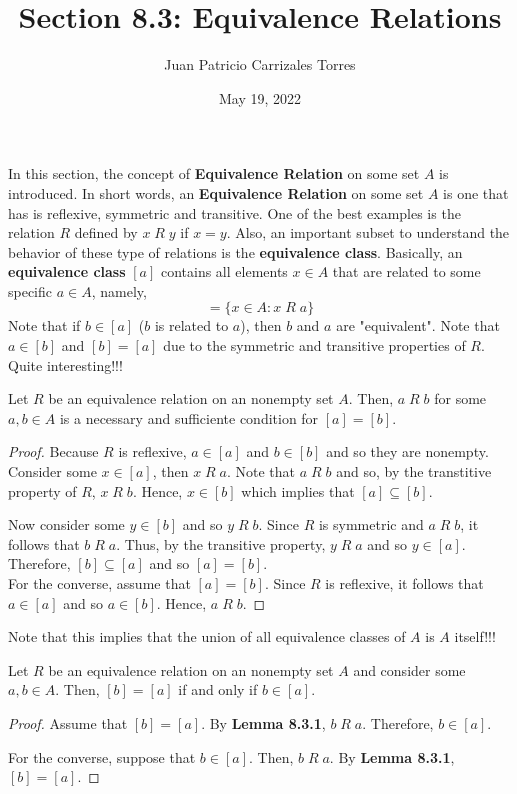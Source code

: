 \documentclass[12pt]{article}
\newenvironment{lemma}[2][Lemma]{\begin{trivlist}
		\item[\hskip \labelsep {\bfseries #1}\hskip \labelsep {\bfseries #2.}]}{\end{trivlist}}
\newenvironment{corollary}[2][Corollary]{\begin{trivlist}
		\item[\hskip \labelsep {\bfseries #1}\hskip \labelsep {\bfseries #2.}]}{\end{trivlist}}
\begin{document}
 
	
	\title{Section 8.3: Equivalence Relations}
	\author{Juan Patricio Carrizales Torres}
	\date{May 19, 2022}
	\maketitle
	
	In this section, the concept of \textbf{Equivalence Relation} on some set $A$ is introduced. In short words, an \textbf{Equivalence Relation} on some set $A$ is one that has is reflexive, symmetric and transitive. One of the best examples is the relation $R$ defined by $x\; R \; y$ if $x=y$. Also, an important subset to understand the behavior of these type of relations is the \textbf{equivalence class}. Basically, an \textbf{equivalence class} $[a]$ contains all elements $x\in A$ that are related to some specific $a\in A$, namely, 
	\begin{equation*}
		[a] = \{x\in A: x\; R \;a\}
	\end{equation*}
	Note that if $b\in [a]$ ($b$ is related to $a$), then $b$ and $a$ are "equivalent". Note that $a\in[b]$ and $[b]=[a]$ due to the symmetric and transitive properties of $R$. Quite interesting!!!  
	
	\begin{lemma}{8.3.1}
		Let $R$ be an equivalence relation on an nonempty set $A$. Then, $a\; R \; b$ for some $a,b\in A$ is a necessary and sufficiente condition for $[a]=[b]$.
		\begin{proof}
			Because $R$ is reflexive, $a\in [a]$ and $b\in [b]$ and so they are nonempty. Consider some $x\in [a]$, then $x\; R \; a$. Note that $a\; R \; b$ and so, by the transtitive property of $R$, $x\; R \; b$. Hence, $x\in [b]$ which implies that $[a]\subseteq [b]$.
			
			Now consider some $y\in [b]$ and so $y\; R\; b$. Since $R$ is symmetric and $a\; R \; b$, it follows that $b\; R \;a$. Thus, by the transitive property, $y\; R\; a$ and so $y\in [a]$. Therefore, $[b]\subseteq [a]$ and so $[a]=[b]$.\\
			
			For the converse, assume that $[a]=[b]$. Since $R$ is reflexive, it follows that $a\in [a]$ and so $a\in [b]$. Hence, $a\; R \; b$.
		\end{proof}
	\end{lemma}
		Note that this implies that the union of all equivalence classes of $A$ is $A$ itself!!!
		
	\begin{corollary}{8.3.1}
		Let $R$ be an equivalence relation on an nonempty set $A$ and consider some $a,b\in A$. Then, $[b] = [a]$ if and only if $b\in [a]$.
		\begin{proof}
			Assume that $[b]=[a]$. By \textbf{Lemma 8.3.1},  $b\; R\; a$. Therefore, $b\in [a]$.
			
			For the converse, suppose that $b \in [a]$. Then, $b\; R\; a$. By \textbf{Lemma 8.3.1}, $[b]=[a]$.
		\end{proof}
	\end{corollary}
	
\end{document}
